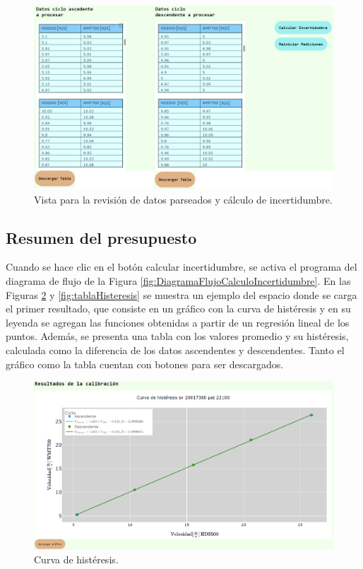 \begin{figure}[H]
    \centering
    \includegraphics[width=0.9\linewidth]{Figuras/AplicacionWeb/frontend/procesarDatos2.png}
    \caption{Vista para la revisión de datos parseados y cálculo de incertidumbre.}
    \label{fig:procesarDatos2}
\end{figure}



\subsection{Resumen del presupuesto}\label{sec:Resultados}

Cuando se hace clic en el botón calcular incertidumbre, se activa el programa del diagrama de flujo de la Figura \ref{fig:DiagramaFlujoCalculoIncertidumbre}. En las Figuras \ref{fig:curvaHisteris} y \ref{fig:tablaHisteresis} se muestra un ejemplo del espacio donde se carga el primer resultado, que consiste en un gráfico con la curva de histéresis y en su leyenda se agregan las funciones obtenidas a partir de un regresión lineal de los puntos. Además, se presenta una tabla con los valores promedio y su histéresis, calculada como la diferencia de los datos ascendentes y descendentes. Tanto el gráfico como la tabla cuentan con botones para ser descargados.

\begin{figure}[H]
    \centering
    \includegraphics[width=1\linewidth]{Figuras/AplicacionWeb/frontend/curvaHisteris.png}
    \caption{Curva de histéresis.}
    \label{fig:curvaHisteris}
\end{figure}

